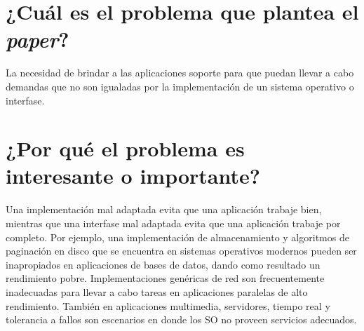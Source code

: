 \section{¿Cuál es el problema que plantea el \textit{paper}?}
La necesidad de brindar a las aplicaciones soporte para que puedan llevar a cabo demandas que no son igualadas por la implementación de un sistema operativo o interfase.

\section{¿Por qué el problema es interesante o importante?}
Una implementación mal adaptada evita que una aplicación trabaje bien, mientras que una interfase mal adaptada evita que una aplicación trabaje por completo. Por ejemplo, una implementación de almacenamiento y algoritmos de paginación en disco que se encuentra en sistemas operativos modernos pueden ser inapropiados en aplicaciones de bases de datos, dando como resultado un rendimiento pobre. Implementaciones genéricas de red son frecuentemente inadecuadas para llevar a cabo tareas en aplicaciones paralelas de alto rendimiento. También en aplicaciones multimedia, servidores, tiempo real y tolerancia a fallos son escenarios en donde los SO no proveen servicios adecuados.


